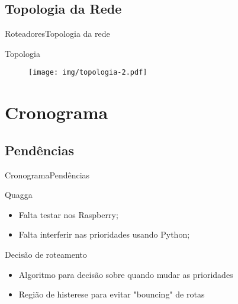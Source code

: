 \documentclass{beamer}
\begin{document}
\subsection{Topologia da Rede}
\begin{frame}[fragile]{Roteadores}{Topologia da rede}

    \begin{block}{Topologia} 
        \begin{figure}[t]
            \centerline{\texttt{[image: img/topologia-2.pdf]}}    
        \end{figure}    
    \end{block}
\end{frame}

\section{Cronograma}

\subsection{Pendências}

\begin{frame}[fragile]{Cronograma}{Pendências}

    \begin{block}{Quagga}    
        \begin{itemize}
            \item Falta testar nos Raspberry;
            \item Falta interferir nas prioridades usando Python;
        \end{itemize}
    \end{block}

    \begin{block}{Decisão de roteamento}
        \begin{itemize}
            \item Algoritmo para decisão sobre quando mudar as prioridades
            \item Região de histerese para evitar "bouncing" de rotas
        \end{itemize}
    \end{block}
\end{frame}
\end{document}
